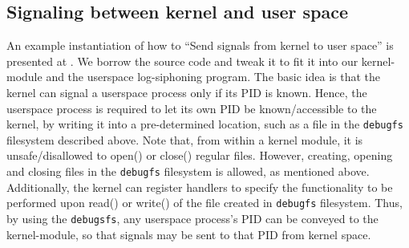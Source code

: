 \subsection{Signaling between kernel and user space}
An example instantiation of how to ``Send signals from kernel to user space'' 
is presented at \cite{kernel-signaling}. We borrow the source code and
tweak it to fit it into our kernel-module and the userspace log-siphoning
program. The basic idea is that the kernel can signal a userspace process
only if its PID is known. Hence, the userspace process is required to 
let its own PID be known/accessible to the kernel, by writing it into a
pre-determined location, such as a file in the \texttt{debugfs} filesystem
described above. Note that, from within a kernel module, it is 
unsafe/disallowed to open() or close() regular files. However, creating,
opening and closing files in the \texttt{debugfs} filesystem is allowed,
as mentioned above. Additionally, the kernel can register handlers to 
specify the functionality to be performed upon read() or write() of
the file created in \texttt{debugfs} filesystem. Thus, by using the
\texttt{debugsfs}, any userspace process's PID can be conveyed to the
kernel-module, so that signals may be sent to that PID from kernel space.
